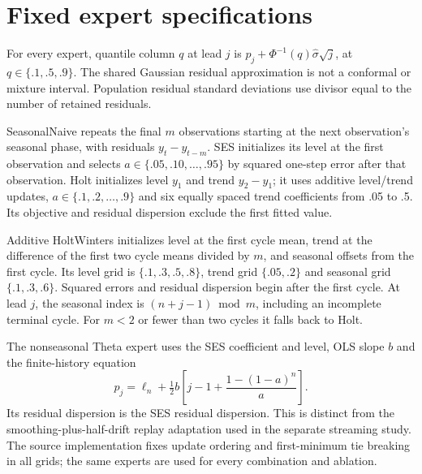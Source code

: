 \documentclass[11pt,a4paper]{article}
\begin{document}
\appendix
\section{Fixed expert specifications}
For every expert, quantile column $q$ at lead $j$ is $p_j+\Phi^{-1}(q)\hat\sigma\sqrt j$, at $q\in\{.1,.5,.9\}$. The shared Gaussian residual approximation is not a conformal or mixture interval. Population residual standard deviations use divisor equal to the number of retained residuals.

SeasonalNaive repeats the final $m$ observations starting at the next observation's seasonal phase, with residuals $y_t-y_{t-m}$. SES initializes its level at the first observation and selects $a\in\{.05,.10,\ldots,.95\}$ by squared one-step error after that observation. Holt initializes level $y_1$ and trend $y_2-y_1$; it uses additive level/trend updates, $a\in\{.1,.2,\ldots,.9\}$ and six equally spaced trend coefficients from .05 to .5. Its objective and residual dispersion exclude the first fitted value.

Additive HoltWinters initializes level at the first cycle mean, trend at the difference of the first two cycle means divided by $m$, and seasonal offsets from the first cycle. Its level grid is $\{.1,.3,.5,.8\}$, trend grid $\{.05,.2\}$ and seasonal grid $\{.1,.3,.6\}$. Squared errors and residual dispersion begin after the first cycle. At lead $j$, the seasonal index is $(n+j-1)\bmod m$, including an incomplete terminal cycle. For $m<2$ or fewer than two cycles it falls back to Holt.

The nonseasonal Theta expert uses the SES coefficient and level, OLS slope $b$ and the finite-history equation~\cite{theta}
\begin{equation}
p_j=\ell_n+\tfrac12 b\left[j-1+\frac{1-(1-a)^n}{a}\right].
\end{equation}
Its residual dispersion is the SES residual dispersion. This is distinct from the smoothing-plus-half-drift replay adaptation used in the separate streaming study. The source implementation fixes update ordering and first-minimum tie breaking in all grids; the same experts are used for every combination and ablation.
\end{document}
